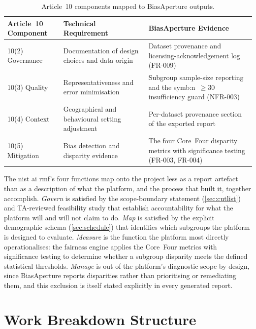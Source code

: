 \begin{table}[htbp]
    \centering
    \renewcommand{\arraystretch}{1.3}
    \caption{Article~10 components mapped to BiasAperture outputs.}
    \label{tab:art10}
    \begin{tabular}{p{2.6cm}p{4.7cm}p{5.2cm}}
        \toprule
        \textbf{Article~10 Component} & \textbf{Technical Requirement} & \textbf{BiasAperture Evidence} \\
        \midrule
        10(2) Governance & Documentation of design choices and data origin & Dataset provenance and licensing-acknowledgement log (FR-009) \\
        10(3) Quality & Representativeness and error minimisation & Subgroup sample-size reporting and the \gls{symb:n}~$\geq 30$ insufficiency guard (NFR-003) \\
        10(4) Context & Geographical and behavioural setting adjustment & Per-dataset provenance section of the exported report \\
        10(5) Mitigation & Bias detection and disparity evidence & The four Core~Four disparity metrics with significance testing (FR-003, FR-004) \\
        \bottomrule
    \end{tabular}
\end{table}

The \gls{nist} \gls{ai} \gls{rmf}'s four functions map onto the project less as a report artefact than as a description of what the platform, and the process that built it, together accomplish. \emph{Govern} is satisfied by the scope-boundary statement (\cref{sec:cutlist}) and TA-reviewed feasibility study that establish accountability for what the platform will and will not claim to do. \emph{Map} is satisfied by the explicit demographic schema (\cref{sec:schedule}) that identifies which subgroups the platform is designed to evaluate. \emph{Measure} is the function the platform most directly operationalises: the fairness engine applies the Core~Four metrics with significance testing to determine whether a subgroup disparity meets the defined statistical thresholds. \emph{Manage} is out of the platform's diagnostic scope by design, since BiasAperture reports disparities rather than prioritising or remediating them, and this exclusion is itself stated explicitly in every generated report.

\section{Work Breakdown Structure}
\label{sec:wbs}

